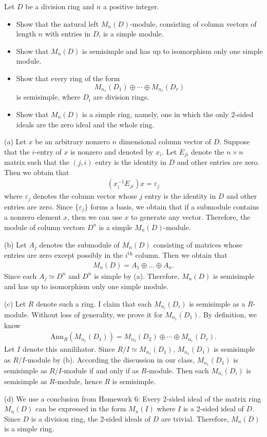 Let $D$ be a division ring and $n$ a positive integer.
\begin{itemize}
    \item[(a)] Show that the natural left $M_n(D)$-module, consisting of column vectors of length $n$ with entries in $D$, is a simple module.
    \item[(b)] Show that $M_n(D)$ is semisimple and has up to isomorphism only one simple module.
    \item[(c)] Show that every ring of the form
    \[ M_{n_1}(D_1) \oplus \cdots \oplus M_{n_r}(D_r) \]
    is semisimple, where $D_i$ are division rings.
    \item[(d)] Show that $M_n(D)$ is a simple ring, namely, one in which the only 2-sided ideals are the zero ideal and the whole ring.
\end{itemize}
\begin{solution}
(a) Let $x$ be an arbitrary nonzero $n$ dimensional column vector of $D$. Suppose that the $i$-entry of $x$ is nonzero and denoted by $x_i$. 
Let $E_{ji}$ denote the $n\times n$ matrix such that the $(j,i)$ entry is the identity in $D$ and other entries are zero.
Then we obtain that 
\begin{align*}
    (x_i^{-1}E_{ji})x = \varepsilon_j
\end{align*}
where $\varepsilon_j$ denotes the column vector whose $j$ entry is the identity in $D$ and other entries are zero.
Since $\{\varepsilon_j\}$ forms a basis, we obtain that if a submodule contains a nonzero element $x$, then we can use $x$ to generate any vector. Therefore, the module of column vectors $D^n$ is a simple $M_n(D)$-module.

(b) Let $A_j$ denotes the submodule of $M_n(D)$ consisting of matrices whose entries are zero except possibly in the $i^{\text{th}}$ column. Then we obtain that 
\begin{align*}
    M_n(D) = A_1\oplus \dots\oplus A_n.
\end{align*} 
Since each $A_j\simeq D^n$ and $D^n$ is simple by (a). Therefore, $M_n(D)$ is semisimple and has up to isomorphism only one simple module.

(c) Let $R$ denote such a ring. I claim that each $M_{n_i}(D_i)$ is semisimple as a $R$-module.
Without loss of generality, we prove it for $M_{n_1}(D_1)$. By definition, we know 
\begin{align*}
    \text{Ann}_R(M_{n_1}(D_1)) = M_{n_2}(D_2) \oplus \cdots \oplus M_{n_r}(D_r).
\end{align*}
Let $I$ denote this annilihator. Since $R/I\simeq M_{n_1}(D_1)$, $M_{n_1}(D_1)$ is semisimple as $R/I$-module by (b).
According the discussion in our class, $M_{n_1}(D_1)$ is semisimple as $R/I$-module if and only if as $R$-module.
Then each $M_{n_i}(D_i)$ is semisimple as $R$-module, hence $R$ is semisimple.

(d) We use a conclusion from Homework 6: Every 2-sided ideal of the matrix ring $M_n(D)$ can be expressed in the form $M_n(I)$ where $I$ is a 2-sided ideal of $D$.
Since $D$ is a division ring, the 2-sided ideals of $D$ are trivial. Therefore, $M_n(D)$ is a simple ring.
\end{solution}





